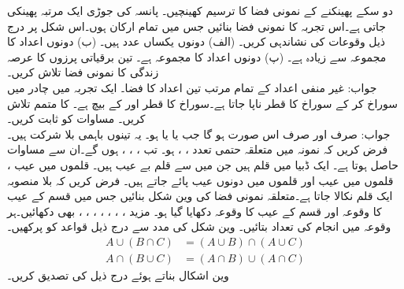 \quad
دو سکے پھینکنے کے نمونی فضا کا ترسیم کھینچیں۔
\quad
پانسہ کی جوڑی ایک مرتبہ پھینکی جاتی ہے۔اس تجربہ کا نمونی فضا بنائیں جس میں تمام ارکان ہوں۔اس شکل پر درج ذیل وقوعات کی نشاندہی کریں۔
(الف) دونوں یکساں عدد ہیں۔ (ب) دونوں اعداد کا مجموعہ  سے زیادہ ہے۔ (پ) دونوں اعداد کا مجموعہ  ہے۔
\quad
تین برقیاتی پرزوں کا عرصہ زندگی کا نمونی فضا تلاش کریں۔\\
جواب:\quad
غیر منفی اعداد کے تمام مرتب تین اعداد کا فضا۔ 
\quad
ایک تجربہ میں چادر میں سوراخ کر کے سوراخ کا قطر ناپا جاتا ہے۔سوراخ  کا قطر  اور  کے بیچ ہے۔ کا متمم تلاش کریں۔
\quad
مساوات  کو ثابت کریں۔\\
جواب:\quad
{} صرف اور صرف اس صورت ہو گا جب  یا  یا   ہو۔ یہ تینوں باہمی بلا شرکت ہیں۔فرض کریں کہ نمونہ میں متعلقہ حتمی تعدد ، ،  ہو۔ تب ، ، ،  ہوں گے۔ان سے مساوات  حاصل ہوتا ہے۔
\quad
ایک ڈبیا میں  قلم ہیں جن میں سے  قلم بے عیب ہیں۔ قلموں میں عیب ،  قلموں میں عیب  اور  قلموں میں دونوں عیب پائے جاتے ہیں۔ فرض کریں کہ بلا منصوبہ ایک قلم نکالا جاتا ہے۔متعلقہ نمونی فضا  کی وین شکل بنائیں جس میں  قسم کے عیب کا وقوعہ  اور   قسم کے عیب کا وقوعہ  دکھایا گیا ہو۔ مزید ، ، ، ، ، ، ،  بھی دکھائیں۔ہر وقوعہ میں انجام کی تعداد بتائیں۔
\quad
وین شکل کی مدد سے درج ذیل قواعد کو پرکھیں۔
\begin{align*}
A\cup (B\cap C)&=(A\cup B) \cap (A\cup C)\\
A\cap (B\cup C)&=(A\cap B)\cup (A\cap C)
\end{align*}
\quad {} \quad 
وین اشکال بناتے ہوئے درج ذیل  کی تصدیق کریں۔
